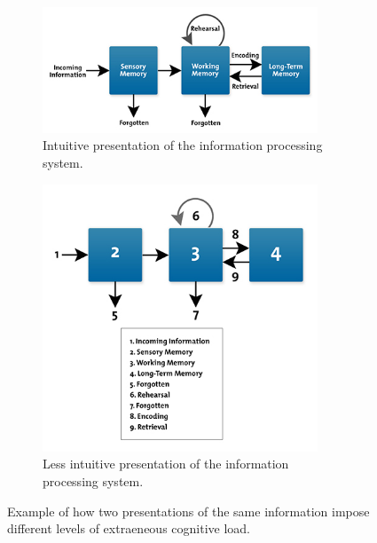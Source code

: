 \begin{figure}[h]
    \begin{subfigure}[b]{\textwidth}
        \includegraphics[width=0.9\textwidth]{figures/bt_information_processingA.jpg}
        \caption{Intuitive presentation of the information processing system.}
        \label{fig:bt/information_processingA}
    \end{subfigure}
    \begin{subfigure}[b]{\textwidth}
        \includegraphics[width=0.9\textwidth]{figures/bt_information_processingB.jpg}
        \caption{Less intuitive presentation of the information processing system.}
        \label{fig:bt/information_processingB}
    \end{subfigure}
    \caption{Example of how two presentations of the same information impose different levels of extraeneous cognitive load.}
\end{figure}

